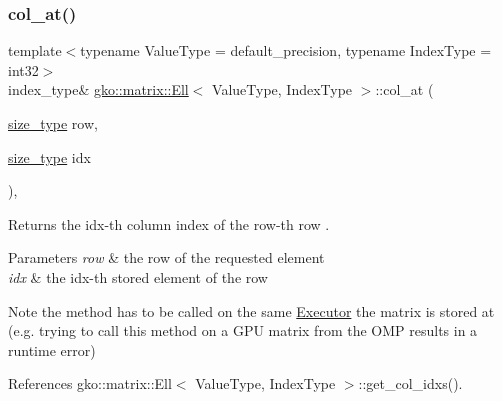 \subsubsection{\texorpdfstring{col\+\_\+at()}{col\_at()}\hspace{0.1cm}{\footnotesize\ttfamily [1/2]}}
{\footnotesize\ttfamily template$<$typename Value\+Type = default\+\_\+precision, typename Index\+Type = int32$>$ \\
index\+\_\+type\& \hyperlink{classgko_1_1matrix_1_1Ell}{gko\+::matrix\+::\+Ell}$<$ Value\+Type, Index\+Type $>$\+::col\+\_\+at (\begin{DoxyParamCaption}\item[{\hyperlink{namespacegko_a6e5c95df0ae4e47aab2f604a22d98ee7}{size\+\_\+type}}]{row,  }\item[{\hyperlink{namespacegko_a6e5c95df0ae4e47aab2f604a22d98ee7}{size\+\_\+type}}]{idx }\end{DoxyParamCaption})\hspace{0.3cm}{\ttfamily [inline]}, {\ttfamily [noexcept]}}



Returns the {\ttfamily idx}-\/th column index of the {\ttfamily row}-\/th row . 


\begin{DoxyParams}{Parameters}
{\em row} & the row of the requested element \\
\hline
{\em idx} & the idx-\/th stored element of the row\\
\hline
\end{DoxyParams}
\begin{DoxyNote}{Note}
the method has to be called on the same \hyperlink{classgko_1_1Executor}{Executor} the matrix is stored at (e.\+g. trying to call this method on a G\+PU matrix from the O\+MP results in a runtime error) 
\end{DoxyNote}


References gko\+::matrix\+::\+Ell$<$ Value\+Type, Index\+Type $>$\+::get\+\_\+col\+\_\+idxs().

\mbox{\label{classgko_1_1matrix_1_1Ell_a1ac1702011ead4e56857de130b4a5301}} 
